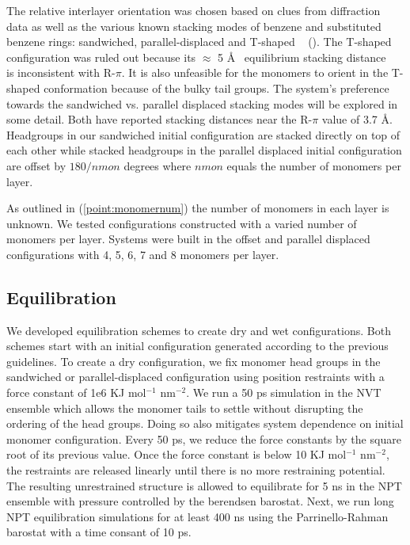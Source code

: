 \documentclass{article}
\newcommand{\angstrom}{\textup{\AA}}
\begin{document}
  The relative interlayer orientation was chosen based on clues from
  diffraction data as well as the various known stacking modes of benzene and
  substituted benzene rings: sandwiched, parallel-displaced and T-shaped
  ~\cite{sinnokrot_estimates_2002} ().
  The T-shaped configuration was ruled out because its $\approx$ 5 \angstrom~
  equilibrium stacking distance ~\cite{sinnokrot_estimates_2002} is inconsistent
  with R-$\pi$. It is also unfeasible for the monomers to orient in the T-shaped
  conformation because of the bulky tail groups. The system's preference towards
  the sandwiched vs. parallel displaced stacking modes will be explored in some
  detail.  Both have reported stacking distances near the R-$\pi$ value of 3.7
  \angstrom. Headgroups in our sandwiched initial configuration are stacked
  directly on top of each other while stacked headgroups in the parallel
  displaced initial configuration are offset by $180/nmon$ degrees where $nmon$
  equals the number of monomers per layer.

  As outlined in (\ref{point:monomernum}) the number of monomers in each layer is
  unknown. We tested configurations constructed with a varied number of
  monomers per layer. Systems were built in the offset and parallel displaced
  configurations with 4, 5, 6, 7 and 8 monomers per layer.

  \subsection{Equilibration}

  We developed equilibration schemes to create dry and wet configurations. Both
  schemes start with an initial configuration generated according to the previous
  guidelines. To create a dry configuration, we fix monomer head groups in the
  sandwiched or parallel-displaced configuration using position restraints with a
  force constant of 1e6 KJ mol$^{-1}$ nm$^{-2}$. We run a 50 ps simulation in the
  NVT ensemble which allows the monomer tails to settle without disrupting the
  ordering of the head groups. Doing so also mitigates system dependence on
  initial monomer configuration. Every 50 ps, we reduce the force constants by
  the square root of its previous value. Once the force constant is below 10 KJ
  mol$^{-1}$ nm$^{-2}$, the restraints are released linearly until there is no more
  restraining potential. The resulting unrestrained structure is allowed to
  equilibrate for 5 ns in the NPT ensemble with pressure controlled by the
  berendsen barostat. Next, we run long NPT equilibration simulations for at
  least 400 ns using the Parrinello-Rahman barostat with a time consant of 10 ps.
\end{document}
